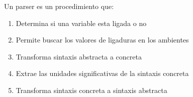 {
Un parser es un procedimiento que:
	\begin{enumerate}
		\item Determina si una variable esta ligada o no
		\item Permite buscar los valores de ligaduras en los ambientes
		\item Transforma sintaxis abstracta a concreta
		\item Extrae las unidades significativas de la sintaxis concreta
		\item Transforma sintaxis concreta a sintaxis abstracta %
	\end{enumerate}
}
  
